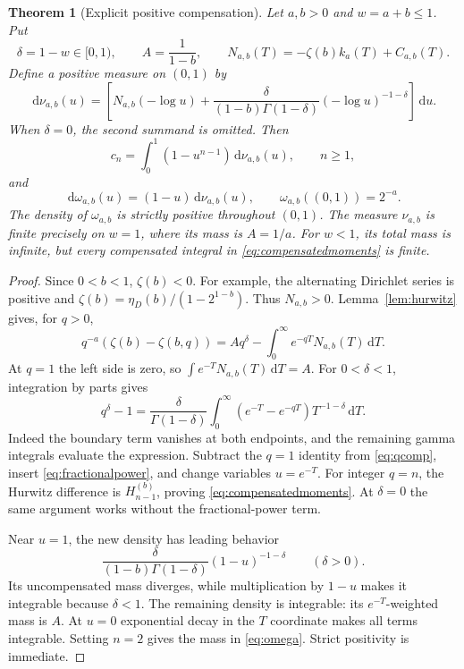 \documentclass[11pt]{article}
\numberwithin{equation}{section}
\newtheorem{theorem}{Theorem}[section]
\theoremstyle{definition}
\theoremstyle{remark}
\newcommand{\dd}{\,\mathrm d}
\begin{document}
\begin{theorem}[Explicit positive compensation]\label{thm:compensated}
Let $a,b>0$ and $w=a+b\le1$. Put
\[
 \delta=1-w\in[0,1),\qquad A=\frac1{1-b},\qquad
 N_{a,b}(T)=-\zeta(b)k_a(T)+C_{a,b}(T).
\]
Define a positive measure on $(0,1)$ by
\begin{equation}\label{eq:nu}
 \dd\nu_{a,b}(u)=
 \left[N_{a,b}(-\log u)
 +\frac{\delta}{(1-b)\Gamma(1-\delta)}
             (-\log u)^{-1-\delta}\right]\dd u.
\end{equation}
When $\delta=0$, the second summand is omitted. Then
\begin{equation}\label{eq:compensatedmoments}
 c_n=\int_0^1(1-u^{n-1})\dd\nu_{a,b}(u),\qquad n\ge1,
\end{equation}
and
\begin{equation}\label{eq:omega}
 \dd\omega_{a,b}(u)=(1-u)\dd\nu_{a,b}(u),\qquad
 \omega_{a,b}((0,1))=2^{-a}.
\end{equation}
The density of $\omega_{a,b}$ is strictly positive throughout $(0,1)$.
The measure $\nu_{a,b}$ is finite precisely on $w=1$, where its mass
is $A=1/a$. For $w<1$, its total mass is infinite, but every compensated
integral in \eqref{eq:compensatedmoments} is finite.
\end{theorem}
\begin{proof}
Since $0<b<1$, $\zeta(b)<0$. For example, the alternating Dirichlet
series is positive and $\zeta(b)=\eta_D(b)/(1-2^{1-b})$.
Thus $N_{a,b}>0$. Lemma~\ref{lem:hurwitz} gives, for $q>0$,
\begin{equation}\label{eq:qcomp}
 q^{-a}(\zeta(b)-\zeta(b,q))
   =Aq^\delta-\int_0^\infty e^{-qT}N_{a,b}(T)\dd T.
\end{equation}
At $q=1$ the left side is zero, so
$\int e^{-T}N_{a,b}(T)\dd T=A$.
For $0<\delta<1$, integration by parts gives
\begin{equation}\label{eq:fractionalpower}
 q^\delta-1=\frac{\delta}{\Gamma(1-\delta)}
 \int_0^\infty(e^{-T}-e^{-qT})T^{-1-\delta}\dd T.
\end{equation}
Indeed the boundary term vanishes at both endpoints, and the remaining
gamma integrals evaluate the expression. Subtract the $q=1$ identity
from \eqref{eq:qcomp}, insert \eqref{eq:fractionalpower}, and change
variables $u=e^{-T}$. For integer $q=n$, the Hurwitz difference is
$H_{n-1}^{(b)}$, proving \eqref{eq:compensatedmoments}. At $\delta=0$
the same argument works without the fractional-power term.

Near $u=1$, the new density has leading behavior
\[
 \frac{\delta}{(1-b)\Gamma(1-\delta)}(1-u)^{-1-\delta}
 \qquad(\delta>0).
\]
Its uncompensated mass diverges, while multiplication by $1-u$ makes
it integrable because $\delta<1$. The remaining density is integrable:
its $e^{-T}$-weighted mass is $A$. At $u=0$ exponential decay in the
$T$ coordinate makes all terms integrable. Setting $n=2$ gives the
mass in \eqref{eq:omega}. Strict positivity is immediate.
\end{proof}
\end{document}
